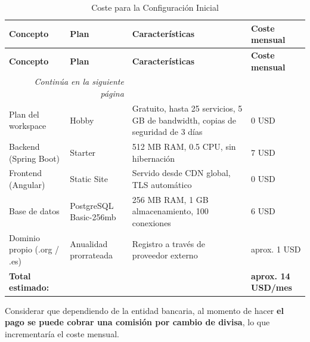 \begin{longtable}[]{@{}
        p{}
        p{}
        p{}
        p{}@{}}

    \caption{Coste para la Configuración Inicial} \\

    \toprule
    \textbf{Concepto} & \textbf{Plan} & \textbf{Características} & \textbf{Coste mensual} \\
    \midrule
    \endfirsthead %

    \toprule
    \textbf{Concepto} & \textbf{Plan} & \textbf{Características} & \textbf{Coste mensual} \\
    \midrule
    \endhead %

    \midrule
    \multicolumn{2}{r}{\small\emph{Continúa en la siguiente página}} \\
    \endfoot %

    \bottomrule
    \endlastfoot %

    Plan del workspace & Hobby & Gratuito, hasta 25 servicios, 5 GB de bandwidth, 
    copias de seguridad de 3 días & 0 USD \\
    \midrule

    Backend (Spring Boot) & Starter & 512 MB RAM, 0.5 CPU, sin hibernación & 7 USD \\
    \midrule

    Frontend (Angular) & Static Site & Servido desde CDN global, TLS automático & 0 USD \\
    \midrule

    Base de datos & PostgreSQL Basic-256mb & 256 MB RAM, 1 GB almacenamiento, 100 conexiones & 6 USD \\
    \midrule

    Dominio propio (.org / .es) & Anualidad prorrateada & Registro a través de proveedor externo & aprox. 1 USD \\ %
    \midrule

    \textbf{Total estimado:} & & & \textbf{aprox. 14 USD/mes} \\
\end{longtable}

Considerar que dependiendo de la entidad bancaria, al momento de hacer\textbf{ el pago se puede cobrar una comisión por cambio 
de divisa}, lo que incrementaría el coste mensual.

